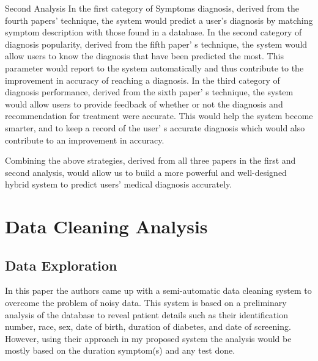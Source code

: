 \documentclass{sig-alternate}
\begin{document}
Second Analysis\newline
In the first category of Symptoms diagnosis, derived from the fourth papers' technique, the system would predict a user's diagnosis by matching symptom description with those found in a database. In the second category of diagnosis popularity, derived from the fifth paper' s technique, the system would allow users to know the diagnosis that have been predicted the most. This parameter would report to the system automatically and thus contribute to the improvement in accuracy of reaching a diagnosis. In the third category of diagnosis performance, derived from the sixth paper' s technique, the system would allow users to provide feedback of whether or not the diagnosis and recommendation for treatment were accurate. This would help the system become smarter, and to keep a record of the user' s accurate diagnosis which would also contribute to an improvement in accuracy.\newline

Combining the above strategies, derived from all three papers in the first and second analysis, would allow us to build a more powerful and well-designed hybrid system to predict users' medical diagnosis accurately.\newline


\section{Data Cleaning Analysis}
\label{Data Cleaning Analysis}

	
	\subsection{Data Exploration}
	\label{Data Exploration}
	In this paper the authors came up with a semi-automatic data cleaning system to overcome the problem of noisy data. This system is based on a preliminary analysis of the database to reveal patient details such as their identification number, race, sex, date of birth, duration of diabetes, and date of screening. However, using their approach in my proposed system the analysis would be mostly based on the duration symptom(s) and any test done.\newline  
	
\end{document}
